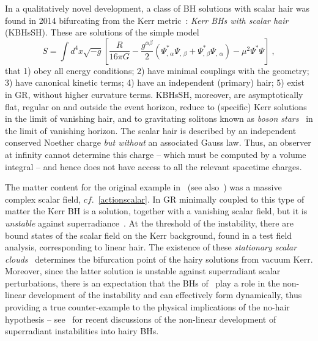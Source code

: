 \bigskip

In a qualitatively novel development, a class of BH solutions with scalar hair was found in 2014 bifurcating from the Kerr metric~\cite{Herdeiro:2014goa}: \textit{Kerr BHs with scalar hair} (KBHsSH).
%
 These are solutions of the simple model
 \begin{equation}
\label{actionscalar}
S=\int  d^4x \sqrt{-g}\left[ \frac{R}{16\pi G}
   -\frac{g^{\alpha\beta}}{2} \left( \Psi_{, \, \alpha}^* \Psi_{, \, \beta} + \Psi _
{, \, \beta}^* \Psi _{, \, \alpha} \right) - \mu^2 \Psi^*\Psi
 \right]  \ ,
\end{equation}
that 1) obey all energy conditions; 2) have minimal couplings with the geometry; 3) have canonical kinetic terms; 4) have an independent (primary) hair; 5) exist in GR, without higher curvature terms. KBHsSH, moreover, are asymptotically flat, regular on and outside the event horizon, reduce to (specific) Kerr solutions in the limit of vanishing hair, and to gravitating solitons known as \textit{boson stars}~\cite{Schunck:2003kk,Liebling:2012fv} in the limit of vanishing horizon. The scalar hair is described by an independent  conserved Noether charge \textit{but without} an associated Gauss law. Thus, an observer at infinity cannot determine this charge -- which must be computed by a volume integral -- and hence does not have access to all the relevant spacetime charges.  

The matter content for the original example in~\cite{Herdeiro:2014goa} (see also~\cite{Herdeiro:2015gia}) was a massive complex scalar field, $cf.$~\eqref{actionscalar}. In GR minimally coupled to this type of matter the Kerr BH is a solution, together with a vanishing scalar field, but it is \textit{unstable} against superradiance~\cite{Press:1972zz,Damour:1976kh,Brito:2015oca}. At the threshold of the instability, there are bound states of the scalar field on the Kerr background, found in a test field analysis, corresponding to linear hair. The existence of these \textit{stationary scalar clouds}~\cite{Hod:2012px,Hod:2013zza,Herdeiro:2014goa,Hod:2014baa,Benone:2014ssa,Hod:2014npa,Hod:2015ota} determines the bifurcation point of the hairy solutions from vacuum Kerr. Moreover, since the latter solution is unstable against superradiant scalar perturbations, there is an expectation that the BHs of~\cite{Herdeiro:2014goa} play a role in the non-linear development of the instability and can effectively form dynamically, thus providing a true counter-example to the physical implications of the no-hair hypothesis -- see~\cite{Sanchis-Gual:2015lje,Bosch:2016vcp} for recent discussions of the non-linear development of superradiant instabilities into hairy BHs. 

